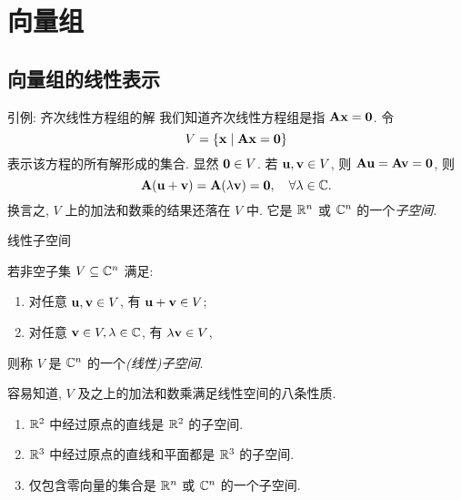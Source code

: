 \section{向量组}

\subsection{向量组的线性表示}

\begin{frame}{引例: 齐次线性方程组的解}
	\onslide<+->
	我们知道齐次线性方程组是指 ${\mathbf{A}}{\mathbf{x}}={\bf0}$.
	\onslide<+->
	令
	\[V=\{{\mathbf{x}}\mid {\mathbf{A}}{\mathbf{x}}={\bf0}\}\]
	表示该方程的所有解形成的集合.
	\onslide<+->
	显然 ${\bf0}\in V$.
	\onslide<+->
	若 ${\mathbf{u}},{\mathbf{v}}\in V$, 则 ${\mathbf{A}}{\mathbf{u}}={\mathbf{A}}{\mathbf{v}}={\bf0}$, 则
	\[{\mathbf{A}}({\mathbf{u}}+{\mathbf{v}})={\mathbf{A}}(\lambda {\mathbf{v}})={\bf0},\quad \forall\lambda\in{\mathbb{C}}.\]
	\onslide<+->
	换言之, $V$ 上的加法和数乘的结果还落在 $V$ 中.
	\onslide<+->
	它是 ${\mathbb{R}}^n$ 或 ${\mathbb{C}}^n$ 的一个\emph{子空间}.
\end{frame}


\begin{frame}{线性子空间}
	\onslide<+->
	\begin{definition}
		若非空子集 $V\subseteq {\mathbb{C}}^n$ 满足:
		\begin{enumerate}
			\item 对任意 ${\mathbf{u}},{\mathbf{v}}\in V$, 有 ${\mathbf{u}}+{\mathbf{v}}\in V$;
			\item 对任意 ${\mathbf{v}}\in V,\lambda\in{\mathbb{C}}$, 有 $\lambda{\mathbf{v}}\in V$,
		\end{enumerate}
		则称 $V$ 是 ${\mathbb{C}}^n$ 的一个\emph{(线性)子空间}.
	\end{definition}
	\onslide<+->
	容易知道, $V$ 及之上的加法和数乘满足线性空间的八条性质.

	\onslide<+->
	\begin{example}
		\begin{enumerate}
			\item ${\mathbb{R}}^2$ 中经过原点的直线是 ${\mathbb{R}}^2$ 的子空间.
			\item ${\mathbb{R}}^3$ 中经过原点的直线和平面都是 ${\mathbb{R}}^3$ 的子空间. 
			\item 仅包含零向量的集合是 ${\mathbb{R}}^n$ 或 ${\mathbb{C}}^n$ 的一个子空间.
		\end{enumerate}
	\end{example}
\end{frame}


